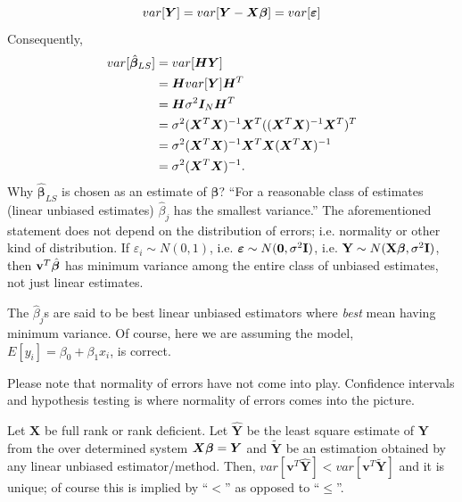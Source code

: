\[var[\bm Y] = var[\bm Y - \bm X \bm \beta ] = var[ \bm \varepsilon ]\]
Consequently, 
\begin{equation}
\begin{aligned}
var[\hat {\bm \beta}_{LS}] &= var[\bm H \bm Y]\\
                         &= \bm H var[ \bm Y] \bm H^T\\
                         &= \bm H \sigma^2 \bm I_N \bm H^T\\
                         &= \sigma^2 {(\bm X^T \bm X)^{-1} \bm X^T} ({(\bm X^T \bm X)^{-1} \bm X^T})^T \\
                         &= \sigma^2 {(\bm X^T \bm X)^{-1} \bm X^T} \bm X (\bm X^T \bm X)^{-1} \\
                         &= \sigma^2 (\bm X^T \bm X)^{-1}.
\end{aligned}
\end{equation}
Why $\hat {\boldsymbol \beta}_{LS}$ is
chosen as an estimate of $\boldsymbol \beta$?
``For a reasonable class of estimates 
(linear unbiased estimates)  $\hat \beta_j$
has the smallest variance.''
The aforementioned statement does not depend
on the distribution of errors; i.e. normality or other
kind of distribution.
If $\varepsilon_i \sim N(0, 1)$,
i.e. ${\boldsymbol \varepsilon} \sim N({\bf 0}, \sigma^2 {\bf I})$, 
i.e. ${\bf Y} \sim N({\bf X}{\boldsymbol \beta}, \sigma^2 {\bf I})$,
then ${\bf v}^T \hat {\boldsymbol \beta}$ has minimum variance
among the entire class of unbiased estimates, not just
linear estimates.


\begin{tcolorbox}
The $\hat \beta_j$s are said to be best linear unbiased estimators
where \emph{best} mean having minimum variance.
Of course, here we are assuming the model, $E[y_i]=\beta_0+\beta_1x_i$,
is correct.

Please note that normality of errors have not come into play.
Confidence intervals and hypothesis testing is where 
normality of errors comes into the picture.
\end{tcolorbox}


\begin{thm}
Let $\bm X$ be full rank or rank deficient.
Let $\hat {\bm Y}$ be the least square estimate of ${\bm Y}$
from the over determined system $\bm X \bm \beta = \bm Y$ and 
$\tilde {\bm Y}$ be an estimation obtained by any linear 
unbiased estimator/method.
Then, $var[\bm v^T \hat {\bm Y}] <  var[\bm v^T \tilde {\bm Y}]$ 
and it is unique; of course this is implied by ``$<$'' as opposed to ``$\le$''.
\end{thm}

